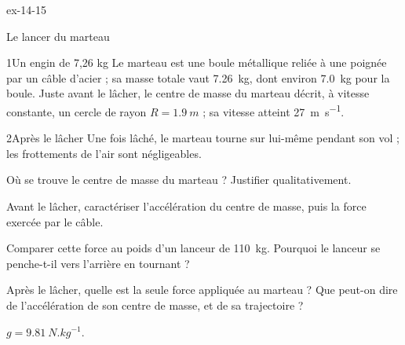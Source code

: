 \begin{blocLivre}{ex-14-15}
\begin{exercice}[3]{Le lancer du marteau}
\begin{docu}{1}{Un engin de 7,26 kg}
Le marteau est une boule métallique reliée à une poignée par un câble d'acier ; sa masse totale vaut \qty{7,26}{kg},
dont environ \qty{7,0}{kg} pour la boule. Juste avant le lâcher, le centre de masse du marteau décrit, à vitesse
constante, un cercle de rayon $R=\qty{1,9}{m}$ ; sa vitesse atteint \qty{27}{m.s^{-1}}.
\end{docu}
\begin{docu}{2}{Après le lâcher}
Une fois lâché, le marteau tourne sur lui-même pendant son vol ; les frottements de l'air sont négligeables.
\end{docu}
\begin{questions}
\item Où se trouve le centre de masse du marteau ? Justifier qualitativement.
\item Avant le lâcher, caractériser l'accélération du centre de masse, puis la force exercée par le câble.
\item \initiative Comparer cette force au poids d'un lanceur de 110~kg. Pourquoi le lanceur se penche-t-il vers
l'arrière en tournant ?
\item Après le lâcher, quelle est la seule force appliquée au marteau ? Que peut-on dire de l'accélération de son centre
de masse, et de sa trajectoire ?
\end{questions}
\begin{donnees}
$g=\qty{9,81}{N.kg^{-1}}$.
\end{donnees}
\end{exercice}
\end{blocLivre}
